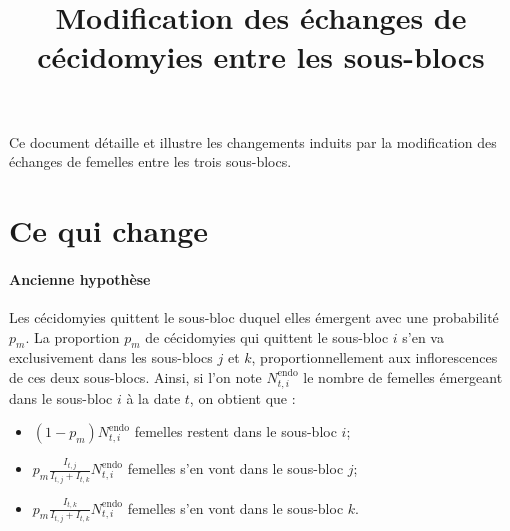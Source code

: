 \documentclass[a4paper, 11pt]{article}
\title{Modification des échanges de cécidomyies entre les sous-blocs}
\author{}
\date{}
\begin{document}
\maketitle 

Ce document détaille et illustre les changements induits par la modification des échanges de femelles entre les trois sous-blocs.

\section{Ce qui change}

\paragraph{Ancienne hypothèse} Les cécidomyies quittent le sous-bloc duquel elles émergent avec une probabilité $p_m$. La proportion $p_m$ de cécidomyies qui quittent le sous-bloc $i$ s'en va exclusivement dans les sous-blocs $j$ et $k$, proportionnellement aux inflorescences de ces deux sous-blocs. Ainsi, si l'on note $N^{\text{endo}}_{t, i}$ le nombre de femelles émergeant dans le sous-bloc $i$ à la date $t$, on obtient que :
\begin{itemize}
 \item $(1-p_m)N^{\text{endo}}_{t, i}$ femelles restent dans le sous-bloc $i$;
 \item $p_m \frac{I_{t, j}}{I_{t, j} + I_{t, k}}N^{\text{endo}}_{t, i}$ femelles s'en vont dans le sous-bloc $j$;
 \item $p_m \frac{I_{t, k}}{I_{t, j} + I_{t, k}}N^{\text{endo}}_{t, i}$ femelles s'en vont dans le sous-bloc $k$.
\end{itemize}
\end{document}

